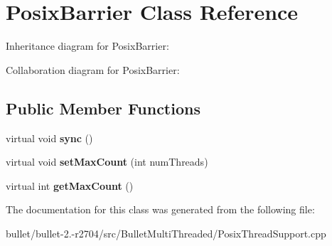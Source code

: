 \hypertarget{class_posix_barrier}{\section{Posix\+Barrier Class Reference}
\label{class_posix_barrier}
}


Inheritance diagram for Posix\+Barrier\+:


Collaboration diagram for Posix\+Barrier\+:
\subsection*{Public Member Functions}
\begin{DoxyCompactItemize}
\item 
\hypertarget{class_posix_barrier_af099b00986e3bc453da5344db7307ec7}{virtual void {\bfseries sync} ()}\label{class_posix_barrier_af099b00986e3bc453da5344db7307ec7}

\item 
\hypertarget{class_posix_barrier_acaea18208ccf29661157fb1dedae5977}{virtual void {\bfseries set\+Max\+Count} (int num\+Threads)}\label{class_posix_barrier_acaea18208ccf29661157fb1dedae5977}

\item 
\hypertarget{class_posix_barrier_a9570155a411d8097f2de8882af803fdc}{virtual int {\bfseries get\+Max\+Count} ()}\label{class_posix_barrier_a9570155a411d8097f2de8882af803fdc}

\end{DoxyCompactItemize}


The documentation for this class was generated from the following file\+:\begin{DoxyCompactItemize}
\item 
bullet/bullet-\/2.-\/r2704/src/\+Bullet\+Multi\+Threaded/Posix\+Thread\+Support.\+cpp\end{DoxyCompactItemize}
